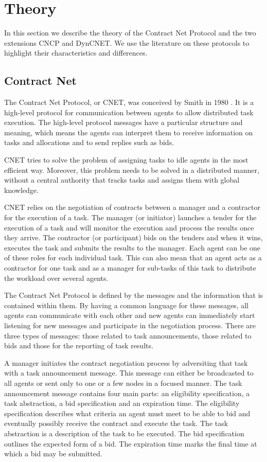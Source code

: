\documentclass[10pt,a4paper]{article}
\begin{document}
\section{Theory}

In this section we describe the theory of the Contract Net Protocol and the two extensions CNCP and DynCNET. We use the literature on these protocols to highlight their characteristics and differences.

\subsection{Contract Net} The Contract Net Protocol, or CNET, was conceived by Smith in 1980 \cite{CNET}. It is a high-level protocol for communication between agents to allow distributed task execution. The high-level protocol messages have a particular structure and meaning, which means the agents can interpret them to receive information on tasks and allocations and to send replies such as bids. 

CNET tries to solve the problem of assigning tasks to idle agents in the most efficient way. Moreover, this problem needs to be solved in a distributed manner, without a central authority that tracks tasks and assigns them with global knowledge.

CNET relies on the negotiation of contracts between a manager and a contractor for the execution of a task. The manager (or initiator) launches a tender for the execution of a task and will monitor the execution and process the results once they arrive. The contractor (or participant) bids on the tenders and when it wins, executes the task and submits the results to the manager. Each agent can be one of these roles for each individual task. This can also mean that an agent acts as a contractor for one task and as a manager for sub-tasks of this task to distribute the workload over several agents.

The Contract Net Protocol is defined by the messages and the information that is contained within them. By having a common language for these messages, all agents can communicate with each other and new agents can immediately start listening for new messages and participate in the negotiation process. There are three types of messages: those related to task announcements, those related to bids and those for the reporting of task results.

A manager initiates the contract negotiation process by adversiting that task with a task announcement message. This message can either be broadcasted to all agents or sent only to one or a few nodes in a focused manner. The task announcement message contains four main parts: an eligibility specification, a task abstraction, a bid specification and an expiration time. The eligibility specification describes what criteria an agent must meet to be able to bid and eventually possibly receive the contract and execute the task. The task abstraction is a description of the task to be executed. The bid specification outlines the expected form of a bid. The expiration time marks the final time at which a bid may be submitted.
\end{document}

